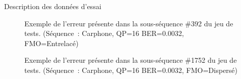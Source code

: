 \begin{section}{Description des données d'essai}
\begin{figure}
	\caption[Erreur présente dans la sous-séquence \#392 du jeu de tests]{Exemple
de l'erreur présente dans la sous-séquence \#392 du jeu de tests. (Séquence~:
Carphone, QP=16 BER=0.0032, FMO=Entrelacé)}
	\label{fig-392}
\end{figure}

\begin{figure}
	\caption[Erreur présente dans la sous-séquence \#1752 du jeu de tests]{Exemple
de l'erreur présente dans la sous-séquence \#1752 du jeu de tests. (Séquence~:
Carphone, QP=16 BER=0.0032, FMO=Dispersé)}
	\label{fig-1752}
\end{figure}


\end{section}
